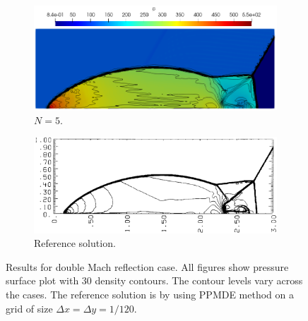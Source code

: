 \documentclass[a4paper,11pt,oneside]{article}
\newcommand{\citear}[1]{\citeauthor{#1} \cite{#1}} %
\begin{document}
\begin{figure}[htbp]
\begin{subfigure}{0.5\linewidth}
		\includegraphics[width=\linewidth]{figures/dmr/res_60_N5_chandrashekhar}
		\caption{$N=5$.}
		\label{subfig:dmr_result_N5}
	\end{subfigure}
	\begin{subfigure}{0.5\linewidth}
		\includegraphics[width=\linewidth]{figures/dmr/woodward_rho_contour}
		\caption{Reference solution.}
		\label{subfig:dmr_woodward_rho_contour}
	\end{subfigure}
	\caption{Results for double Mach reflection case. All figures show pressure surface plot with 30 density contours. The contour levels vary across the cases. The reference solution is by \citear{woodwardColella1984} using PPMDE method on a grid of size $\Delta x = \Delta y = 1/120$.}
\end{figure}

\printbibliography
\end{document}
